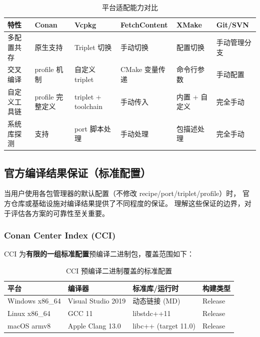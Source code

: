 \documentclass[12pt,a4paper,fontset=fandol]{ctexbook}
\begin{document}
\begin{table}[H]
\centering
\caption{平台适配能力对比}
\label{tab:platform}
\small
\begin{tabularx}{\textwidth}{l >{\raggedright\arraybackslash}X >{\raggedright\arraybackslash}X >{\raggedright\arraybackslash}X >{\raggedright\arraybackslash}X >{\raggedright\arraybackslash}X}
\toprule
\textbf{特性} & \textbf{Conan} & \textbf{Vcpkg} & \textbf{Fetch\allowbreak Content} & \textbf{XMake} & \textbf{Git/SVN} \\
\midrule
多配置共存    & 原生支持       & Triplet 切换   & 手动切换          & 配置切换       & 手动管理分支 \\
交叉编译     & profile 机制   & 自定义 triplet & CMake 变量传递   & 命令行参数     & 手动配置 \\
自定义工具链  & profile 完整定义 & triplet +\allowbreak{} toolchain & 手动传入 & 内置 + 自定义  & 完全手动 \\
系统库探测    & 支持           & port 脚本处理  & 手动处理         & 包描述处理    & 完全手动 \\
\bottomrule
\end{tabularx}
\end{table}

\subsection{官方编译结果保证（标准配置）}

当用户使用各包管理器的默认配置（不修改 recipe/port/triplet/profile）时，
官方仓库或基础设施对编译结果提供了不同程度的保证。
理解这些保证的边界，对于评估各方案的可靠性至关重要。

\subsubsection*{Conan Center Index (CCI)}

CCI 为\textbf{有限的一组标准配置}预编译二进制包，覆盖范围如下：

\begin{table}[H]
\centering
\caption{CCI 预编译二进制覆盖的标准配置}
\label{tab:cci-configs}
\small
\begin{tabular}{l l l l}
\toprule
\textbf{平台} & \textbf{编译器} & \textbf{标准库/运行时} & \textbf{构建类型} \\
\midrule
Windows x86\_64 & Visual Studio 2019 & 动态链接 (MD) & Release \\
Linux x86\_64   & GCC 11            & libstdc++11    & Release \\
macOS armv8     & Apple Clang 13.0  & libc++ (target 11.0) & Release \\
\bottomrule
\end{tabular}
\end{table}
\end{document}
